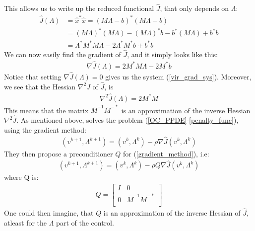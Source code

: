 \documentclass[11pt,a4paper]{article}
\begin{document}
This allows us to write up the reduced functional $\hat{J}$, that only depends on $\Lambda$:
\begin{align*}
\hat{J}(\Lambda)&= \hat{x}^*\hat{x} =
(M  \Lambda -b)^*(M  \Lambda -b) \\
&= (M  \Lambda)^*(M  \Lambda) - (M  \Lambda)^*b-b^*(M  \Lambda) + b^*b \\
&=\Lambda^*M^*M  \Lambda - 2\Lambda^*M^*b + b^*b
\end{align*}
We can now easily find the gradient of $\hat{J}$, and it simply looks like this:
\begin{align*}
\nabla\hat{J}(\Lambda) = 2 M^*M\Lambda - 2M^*b
\end{align*}
Notice that setting $\nabla\hat{J}(\Lambda)=0$ gives us the system (\ref{vir_grad_sys}). Moreover, we see that the Hessian $\nabla^2 \hat{J}$ of $\hat{J}$, is
\begin{align}
\nabla^2 \hat{J}(\Lambda) = 2 M^*M
\end{align}
This means that the matrix $\bar{M}^{-1}\bar{M}^{-*}$ is an approximation of the inverse Hessian $\nabla^2 \hat{J}$. As mentioned above, \cite{maday2002parareal} solves the problem (\ref{OC_PPDE}-\ref{penalty_func}), using the gradient method:
\begin{align}
(v^{k+1},\Lambda^{k+1}) = (v^{k},\Lambda^{k}) -\rho\nabla\hat{J}(v^{k},\Lambda^{k}) \label{gradient_method}
\end{align}
They then propose a preconditioner $Q$ for (\ref{gradient_method}), i.e:
\begin{align}
(v^{k+1},\Lambda^{k+1}) = (v^{k},\Lambda^{k}) -\rho Q\nabla\hat{J}(v^{k},\Lambda^{k}) 
\end{align}
where Q is:
\begin{align}
Q = \left[ \begin{array}{cc}
	I & 0 \\
	0 & \bar{M}^{-1}\bar{M}^{-*} \\
	\end{array} \right]
\end{align}
One could then imagine, that $Q$ is an approximation of the inverse Hessian of $\hat{J}$, atleast for the $\Lambda$ part of the control.
\end{document}
